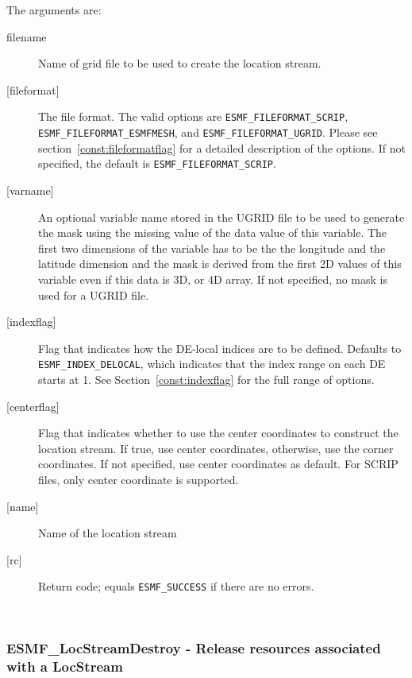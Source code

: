        The arguments are:
       \begin{description}
       \item[filename]
            Name of grid file to be used to create the location stream.  
       \item[{[fileformat]}]
       The file format.  The valid options are {\tt ESMF\_FILEFORMAT\_SCRIP},
       {\tt ESMF\_FILEFORMAT\_ESMFMESH}, and {\tt ESMF\_FILEFORMAT\_UGRID}.
        Please see section~\ref{const:fileformatflag} for a detailed description of the options.
       If not specified, the default is {\tt ESMF\_FILEFORMAT\_SCRIP}.
       \item[{[varname]}]
           An optional variable name stored in the UGRID file to be used to
           generate the mask using the missing value of the data value of
           this variable.  The first two dimensions of the variable has to be the
           the longitude and the latitude dimension and the mask is derived from the
           first 2D values of this variable even if this data is 3D, or 4D array. If not 
           specified, no mask is used for a UGRID file.
       \item[{[indexflag]}]
            Flag that indicates how the DE-local indices are to be defined.
            Defaults to {\tt ESMF\_INDEX\_DELOCAL}, which indicates
            that the index range on each DE starts at 1. See Section~\ref{const:indexflag}
            for the full range of options. 
       \item[{[centerflag]}]
            Flag that indicates whether to use the center coordinates to construct the location stream.
            If true, use center coordinates, otherwise, use the corner coordinates.  If not specified,
            use center coordinates as default.  For SCRIP files, only center coordinate 
            is supported.
       \item[{[name]}]
            Name of the location stream
       \item[{[rc]}]
            Return code; equals {\tt ESMF\_SUCCESS} if there are no errors.
     \end{description}
   
 
\mbox{}\hrulefill\ 
 
\subsubsection [ESMF\_LocStreamDestroy] {ESMF\_LocStreamDestroy - Release resources associated with a LocStream }


